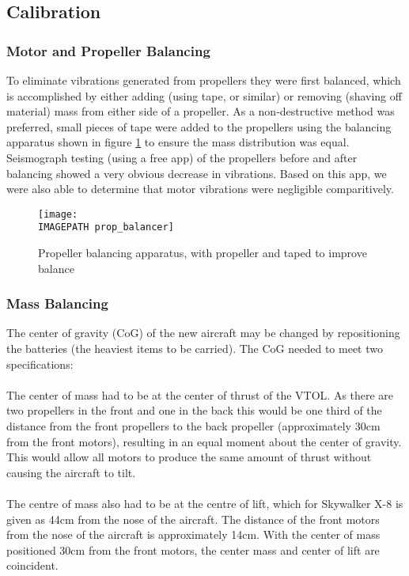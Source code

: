 \subsection{Calibration}
\subsubsection*{Motor and Propeller Balancing}
To eliminate vibrations generated from propellers they were first balanced, which is accomplished by either adding (using tape, or similar) or removing (shaving off material) mass from either side of a propeller. As a non-destructive method was preferred, small pieces of tape were added to the propellers using the balancing apparatus shown in figure \ref{fig:propbalancing} to ensure the mass distribution was equal.  Seismograph testing (using a free app) of the propellers before and after balancing showed a very obvious decrease in vibrations. Based on this app, we were also able to determine that motor vibrations were negligible comparitively.
\begin{figure}[!h]
	\centering
	\texttt{[image: \\IMAGEPATH prop\_balancer]}
	\caption{Propeller balancing apparatus, with propeller and taped to improve balance}
	\label{fig:propbalancing}
\end{figure}

\subsubsection*{Mass Balancing}
The center of gravity (CoG) of the new aircraft may be changed by repositioning the batteries (the heaviest items to be carried). The CoG needed to meet two specifications:
	\\\\The center of mass had to be at the center of thrust of the VTOL. As there are two propellers in the front and one in the back this would be one third of the distance from the front propellers to the back propeller (approximately 30cm from the front motors), resulting in an equal moment about the center of gravity. This would allow all motors to produce the same amount of thrust without causing the aircraft to tilt.
	\\\\The centre of mass also had to be at the centre of lift, which for Skywalker X-8 is given as 44cm from the nose of the aircraft. The distance of the front motors from the nose of the aircraft is approximately 14cm. With the center of mass positioned 30cm from the front motors, the center mass and center of lift are coincident.

